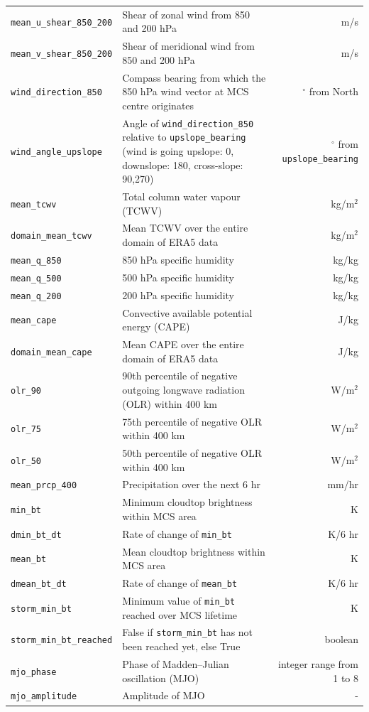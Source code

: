 \begin{table}[!ht]
\begin{tabular}{llr}
        \texttt{mean\_u\_shear\_850\_200} & Shear of zonal wind from 850 and 200 hPa & m/s \\
        \texttt{mean\_v\_shear\_850\_200} & Shear of meridional wind from 850 and 200 hPa & m/s \\
        \texttt{wind\_direction\_850} & Compass bearing from which the 850 hPa wind vector at MCS centre originates & $^\circ$ from North \\
        \texttt{wind\_angle\_upslope} & Angle of \texttt{wind\_direction\_850} relative to \texttt{upslope\_bearing} (wind is going upslope: 0, downslope: 180, cross-slope: 90,270) & $^\circ$ from \texttt{upslope\_bearing} \\
        \texttt{mean\_tcwv} & Total column water vapour (TCWV) & kg/m$^2$ \\
        \texttt{domain\_mean\_tcwv} & Mean TCWV over the entire domain of ERA5 data & kg/m$^2$ \\
        \texttt{mean\_q\_850} & 850 hPa specific humidity & kg/kg \\
        \texttt{mean\_q\_500} & 500 hPa specific humidity & kg/kg \\
        \texttt{mean\_q\_200} & 200 hPa specific humidity & kg/kg \\
        \texttt{mean\_cape} & Convective available potential energy (CAPE) & J/kg \\
        \texttt{domain\_mean\_cape} & Mean CAPE over the entire domain of ERA5 data & J/kg \\
        \texttt{olr\_90} & 90th percentile of negative outgoing longwave radiation (OLR) within 400 km & W/m$^2$ \\
        \texttt{olr\_75} & 75th percentile of negative OLR within 400 km & W/m$^2$ \\
        \texttt{olr\_50} & 50th percentile of negative OLR within 400 km & W/m$^2$ \\
        \texttt{mean\_prcp\_400} & Precipitation over the next 6 hr & mm/hr \\
        \texttt{min\_bt} & Minimum cloudtop brightness within MCS area & K \\
        \texttt{dmin\_bt\_dt} & Rate of change of \texttt{min\_bt} & K/6 hr \\
        \texttt{mean\_bt} & Mean cloudtop brightness within MCS area & K \\
        \texttt{dmean\_bt\_dt} & Rate of change of \texttt{mean\_bt} & K/6 hr \\
        \texttt{storm\_min\_bt} & Minimum value of \texttt{min\_bt} reached over MCS lifetime & K \\
        \texttt{storm\_min\_bt\_reached} & False if \texttt{storm\_min\_bt} has not been reached yet, else True & boolean \\
        \texttt{mjo\_phase} & Phase of Madden--Julian oscillation (MJO) & integer range from 1 to 8 \\
        \texttt{mjo\_amplitude} & Amplitude of MJO & - \\      \bottomrule
    \end{tabular}
\end{table}



